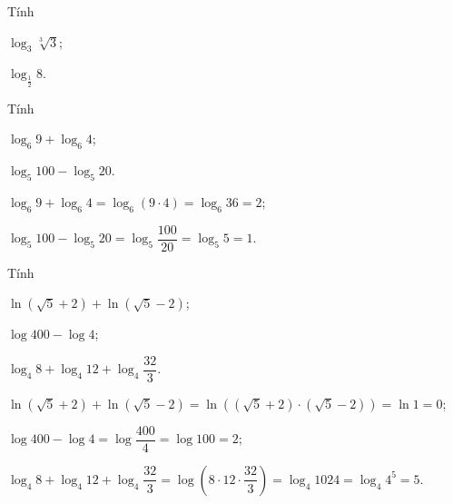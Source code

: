 \begin{vd}%
	Tính
	\begin{listEX}[2]
		\item[a)] $ \log_3 \sqrt[3]{3}$;
		\item[b)] $ \log_{\frac{1}{2}} 8 $.
	\end{listEX}
\end{vd}

\begin{vd}%
	Tính
	\begin{listEX}[2]
		\item  $\log _{6} 9+\log _{6} 4$;
		\item $\log _{5} 100-\log _{5} 20$.
	\end{listEX}
	\loigiai
	{\begin{listEX}[1]
			\item $\log _{6} 9+\log _{6} 4=\log _{6}(9\cdot 4)=\log _{6} 36=2$;
			\item $\log _{5} 100-\log _{5} 20=\log _{5} \dfrac{100}{20}=\log _{5} 5=1$.
		\end{listEX}
	}
\end{vd}

\begin{vd}%
	Tính
	\begin{listEX}[2]
		\item  $\ln \left(\sqrt{5}+2\right)+\ln \left(\sqrt{5}-2\right)$;
		\item $\log 400-\log 4$;
		\item $\log _{4} 8+\log _{4} 12+\log _{4} \dfrac{32}{3}$.
	\end{listEX}
	\loigiai
	{\begin{listEX}[1]
			\item $\ln \left(\sqrt{5}+2\right)+\ln \left(\sqrt{5}-2\right)=\ln \left(\left(\sqrt{5}+2\right)\cdot \left(\sqrt{5}-2\right)\right)=\ln 1=0$;
			\item $\log 400-\log 4=\log\dfrac{400}{4}=\log 100=2$;
			\item $\log _{4} 8+\log _{4} 12+\log _{4} \dfrac{32}{3}=\log \left(8\cdot 12\cdot \dfrac{32}{3}\right)=\log_4 1024=\log_4 4^5=5$.
		\end{listEX}
	}
\end{vd}

